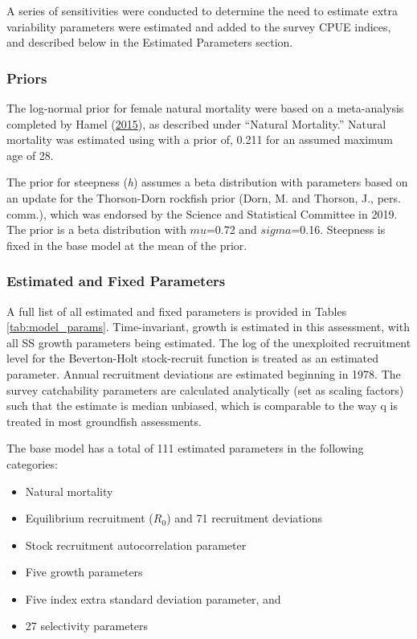 \documentclass[12pt,]{article}
\begin{document}
A series of sensitivities were conducted to determine the need to
estimate extra variability parameters were estimated and added to the
survey CPUE indices, and described below in the Estimated Parameters
section.

\subsubsection{Priors}\label{priors}

The log-normal prior for female natural mortality were based on a
meta-analysis completed by Hamel
(\protect\hyperlink{ref-Hamel2015}{2015}), as described under ``Natural
Mortality.'' Natural mortality was estimated using with a prior of,
0.211 for an assumed maximum age of 28.

The prior for steepness (\emph{h}) assumes a beta distribution with
parameters based on an update for the Thorson-Dorn rockfish prior (Dorn,
M. and Thorson, J., pers. comm.), which was endorsed by the Science and
Statistical Committee in 2019. The prior is a beta distribution with
\(mu\)=0.72 and \(sigma\)=0.16. Steepness is fixed in the base model at
the mean of the prior.

\subsubsection{Estimated and Fixed
Parameters}\label{estimated-and-fixed-parameters}

A full list of all estimated and fixed parameters is provided in Tables
\ref{tab:model_params}. Time-invariant, growth is estimated in this
assessment, with all SS growth parameters being estimated. The log of
the unexploited recruitment level for the Beverton-Holt stock-recruit
function is treated as an estimated parameter. Annual recruitment
deviations are estimated beginning in 1978. The survey catchability
parameters are calculated analytically (set as scaling factors) such
that the estimate is median unbiased, which is comparable to the way q
is treated in most groundfish assessments.

The base model has a total of 111 estimated parameters in the following
categories:

\begin{itemize}
  \item Natural mortality
  \item Equilibrium recruitment ($R_0$) and 71 recruitment deviations
  \item Stock recruitment autocorrelation parameter
  \item Five growth parameters
  \item Five index extra standard deviation parameter, and
  \item 27 selectivity parameters
\end{itemize}
\end{document}
